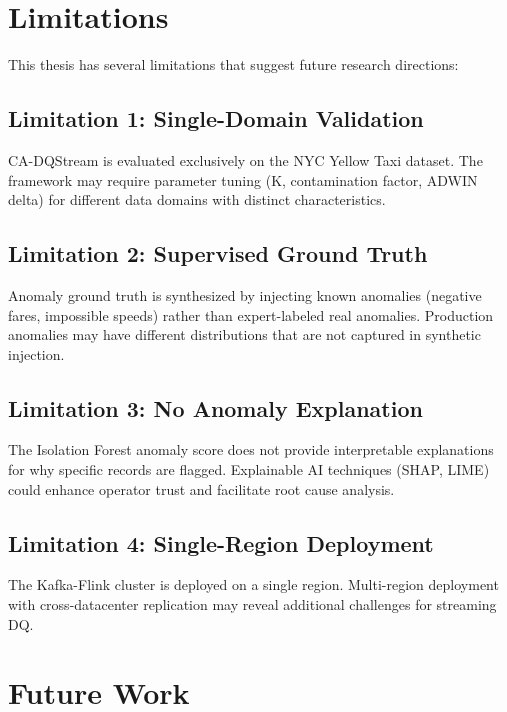 \section{Limitations}

This thesis has several limitations that suggest future research directions:

\subsection{Limitation 1: Single-Domain Validation}
CA-DQStream is evaluated exclusively on the NYC Yellow Taxi dataset. The framework may require parameter tuning (K, contamination factor, ADWIN delta) for different data domains with distinct characteristics.

\subsection{Limitation 2: Supervised Ground Truth}
Anomaly ground truth is synthesized by injecting known anomalies (negative fares, impossible speeds) rather than expert-labeled real anomalies. Production anomalies may have different distributions that are not captured in synthetic injection.

\subsection{Limitation 3: No Anomaly Explanation}
The Isolation Forest anomaly score does not provide interpretable explanations for why specific records are flagged. Explainable AI techniques (SHAP, LIME) could enhance operator trust and facilitate root cause analysis.

\subsection{Limitation 4: Single-Region Deployment}
The Kafka-Flink cluster is deployed on a single region. Multi-region deployment with cross-datacenter replication may reveal additional challenges for streaming DQ.

\section{Future Work}


